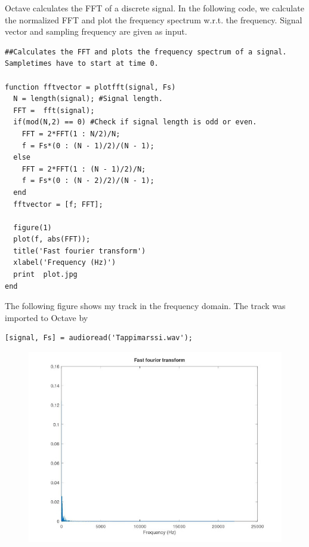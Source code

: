 \documentclass{article}
\begin{document}
    Octave calculates the FFT of a discrete signal.  In the following code, we calculate the normalized FFT and plot the frequency spectrum w.r.t. the frequency. Signal vector and sampling frequency are given as input.

\begin{verbatim}
##Calculates the FFT and plots the frequency spectrum of a signal. Sampletimes have to start at time 0.

function fftvector = plotfft(signal, Fs)
  N = length(signal); #Signal length.
  FFT =  fft(signal);
  if(mod(N,2) == 0) #Check if signal length is odd or even.
    FFT = 2*FFT(1 : N/2)/N;
    f = Fs*(0 : (N - 1)/2)/(N - 1); 
  else
    FFT = 2*FFT(1 : (N - 1)/2)/N;
    f = Fs*(0 : (N - 2)/2)/(N - 1);
  end  
  fftvector = [f; FFT];
  
  figure(1)
  plot(f, abs(FFT));
  title('Fast fourier transform')
  xlabel('Frequency (Hz)')
  print  plot.jpg
end

\end{verbatim}

The following figure shows my track  in the frequency domain. The track was imported to Octave by

\begin{verbatim}
[signal, Fs] = audioread('Tappimarssi.wav');
\end{verbatim}



\begin{figure}
  \includegraphics[width=\linewidth]{tappimarssi.jpg}
\end{figure}
\end{document}
